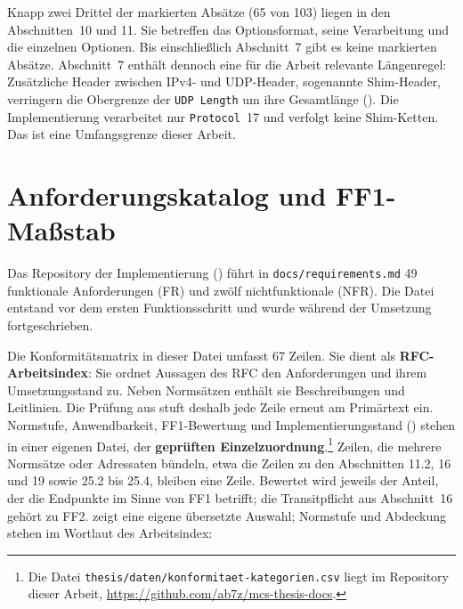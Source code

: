 Knapp zwei Drittel der markierten Absätze (65 von 103) liegen in den Abschnitten~10 und 11. Sie betreffen
das Optionsformat, seine Verarbeitung und die einzelnen Optionen. Bis einschließlich Abschnitt~7 gibt
es keine markierten Absätze. Abschnitt~7 enthält dennoch eine für die Arbeit relevante Längenregel:
Zusätzliche Header zwischen IPv4- und UDP-Header, sogenannte Shim-Header, verringern die Obergrenze der
\texttt{UDP Length} um ihre Gesamtlänge (). Die Implementierung verarbeitet nur
\texttt{Protocol}~17 und verfolgt keine Shim-Ketten. Das ist eine Umfangsgrenze dieser Arbeit.

\section{Anforderungskatalog und FF1-Maßstab}
\label{sec:anforderungsmatrix}
\label{sec:ff1-kriterien}

Das Repository der Implementierung () führt in \texttt{docs/requirements.md} 49
funktionale Anforderungen (FR) und zwölf nichtfunktionale (NFR). Die Datei entstand vor dem ersten Funktionsschritt
und wurde während der Umsetzung fortgeschrieben.

Die Konformitätsmatrix in dieser Datei umfasst 67 Zeilen. Sie dient als \textbf{RFC-Arbeitsindex}:
Sie ordnet Aussagen des RFC den Anforderungen und ihrem Um\-setzungs\-stand zu. Neben Normsätzen enthält sie
Beschreibungen und Leitlinien. Die Prüfung aus  stuft deshalb jede Zeile
erneut am Primärtext ein. Normstufe, Anwendbarkeit, FF1-Bewertung und Implementierungs\-stand
() stehen in einer eigenen Datei, der \textbf{geprüften
Einzelzuordnung}.\footnote{\raggedright Die Datei
\nolinkurl{thesis/daten/konformitaet-kategorien.csv} liegt im Repository dieser Arbeit,
\url{https://github.com/ab7z/mcs-thesis-docs}.}
Zeilen, die mehrere Normsätze oder Adressaten bündeln, etwa die Zeilen zu den Abschnitten 11.2, 16 und 19
sowie 25.2 bis 25.4, bleiben eine Zeile. Bewertet wird jeweils der Anteil, der die Endpunkte im Sinne
von FF1 betrifft; die Transitpflicht aus Abschnitt~16 gehört zu FF2.
 zeigt eine eigene übersetzte Auswahl; Normstufe und Abdeckung stehen im
Wortlaut des Arbeitsindex:

